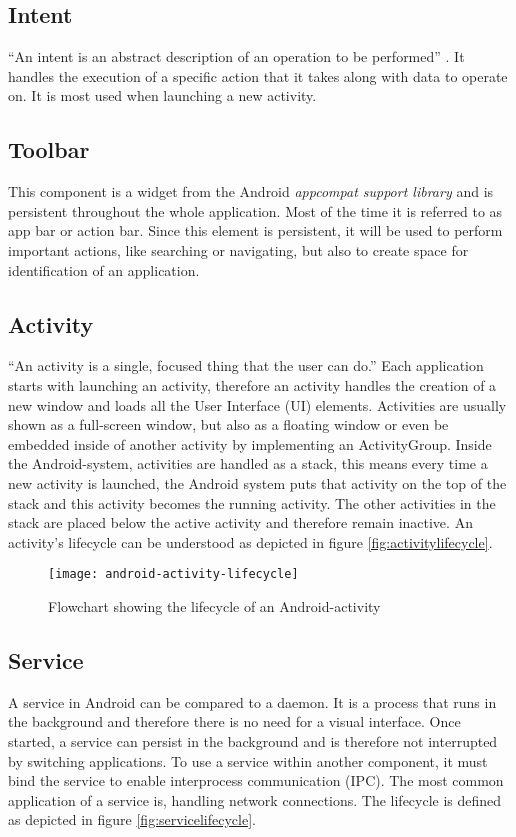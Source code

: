 \subsection{Intent}
``An intent is an abstract description of an operation to be performed'' \autocite{AndroidIntent}. It handles the execution of a specific action that it takes along with data to operate on. It is most used when launching a new activity.

\subsection{Toolbar}
This component is a widget from the Android \emph{appcompat support library} and is persistent throughout the whole application. Most of the time it is referred to as app bar or action bar. Since this element is persistent, it will be used to perform important actions, like searching or navigating, but also to create space for identification of an application.

\subsection{Activity}
``An activity is a single, focused thing that the user can do.'' \autocite{AndroidActivity} Each application starts with launching an activity, therefore an activity handles the creation of a new window and loads all the User Interface (UI) elements. Activities are usually shown as a full-screen window, but also as a floating window or even be embedded inside of another activity by implementing an ActivityGroup. Inside the Android-system, activities are handled as a stack, this means every time a new activity is launched, the Android system puts that activity on the top of the stack and this activity becomes the running activity. The other activities in the stack are placed below the active activity and therefore remain inactive. An activity's lifecycle can be understood as depicted in figure \vref{fig:activitylifecycle}.

\begin{figure}[H]
    \centering
    \texttt{[image: android-activity-lifecycle]}
    \caption{Flowchart showing the lifecycle of an Android-activity}
    \label{fig:activitylifecycle}
\end{figure}

\subsection{Service}
A service in Android can be compared to a daemon. It is a process that runs in the background and therefore there is no need for a visual interface. Once started, a service can persist in the background and is therefore not interrupted by switching applications. To use a service within another component, it must bind the service to enable interprocess communication (IPC). The most common application of a service is, handling network connections. The lifecycle is defined as depicted in figure \vref{fig:servicelifecycle}.

